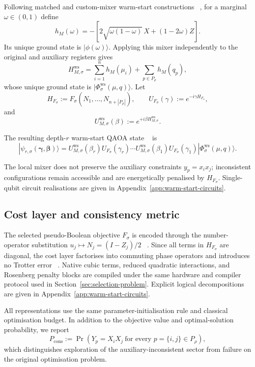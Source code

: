 \documentclass[a4paper,onecolumn,11pt,unpublished]{quantumarticle}
\theoremstyle{remark}
\begin{document}
Following matched and custom-mixer warm-start constructions
~\cite{Egger2021,TateCustom2023}, for a marginal $\omega\in(0,1)$ define
\[
h_M(\omega)
=
-\left[
2\sqrt{\omega(1-\omega)}\,X
+
(1-2\omega)Z
\right].
\]
Its unique ground state is $|\phi(\omega)\rangle$.  Applying this mixer
independently to the original and auxiliary registers gives
\begin{equation}
H_{M,\sigma}^{\mathrm{ws}}
=
\sum_{i=1}^n h_M(\mu_i)
+
\sum_{p\in P_\rho}h_M(q_p),
\label{eq:ws-mixer}
\end{equation}
whose unique ground state is
$|\Phi_\sigma^{\mathrm{ws}}(\mu,q)\rangle$.
Let
\[
H_{F_\sigma}:=F_\sigma(N_1,\ldots,N_{n+|P_\rho|}),
\qquad
U_{F_\sigma}(\gamma):=e^{-i\gamma H_{F_\sigma}},
\]
and
\[
U_{M,\sigma}^{\mathrm{ws}}(\beta)
:=
e^{+i\beta H_{M,\sigma}^{\mathrm{ws}}}.
\]

The resulting depth-$r$ warm-start QAOA state
~\cite{Farhi2014,Egger2021,TateCustom2023} is
\begin{equation}
|\psi_{r,\sigma}(\boldsymbol\gamma,\boldsymbol\beta)\rangle
=
U^{\mathrm{ws}}_{M,\sigma}(\beta_r)
U_{F_\sigma}(\gamma_r)
\cdots
U^{\mathrm{ws}}_{M,\sigma}(\beta_1)
U_{F_\sigma}(\gamma_1)
|\Phi^{\mathrm{ws}}_\sigma(\mu,q)\rangle .
\end{equation}

The local mixer does not preserve the auxiliary constraints
$y_p=x_ix_j$; inconsistent configurations remain accessible and are
energetically penalised by $H_{F_\sigma}$.
Single-qubit circuit realisations are given in
Appendix~\ref{app:warm-start-circuits}.



\subsection{Cost layer and consistency metric}
\label{sec:cost-consistency}
The selected pseudo-Boolean objective $F_\sigma$ is encoded through the
number-operator substitution $u_j\mapsto N_j=(I-Z_j)/2$
~\cite{Hadfield2021}.  Since all terms in
$H_{F_\sigma}$ are diagonal, the cost layer factorises into commuting phase
operators and introduces no Trotter error
~\cite{CampbellDahl2022,Verchere2023}.  Native cubic terms, reduced
quadratic interactions, and Rosenberg penalty blocks are compiled under the
same hardware and compiler protocol used in Section~\ref{sec:selection-problem}.
Explicit logical decompositions are given in
Appendix~\ref{app:warm-start-circuits}.

All representations use the same parameter-initialisation rule and classical
optimisation budget.  In addition to the objective value and optimal-solution
probability, we report
\begin{equation}
P_{\mathrm{cons}}
:=
\Pr\!\left(
Y_p=X_iX_j\ \text{for every }p=\{i,j\}\in P_\rho
\right),
\label{eq:pcons}
\end{equation}
which distinguishes exploration of the auxiliary-inconsistent sector from
failure on the original optimisation problem.
\end{document}
